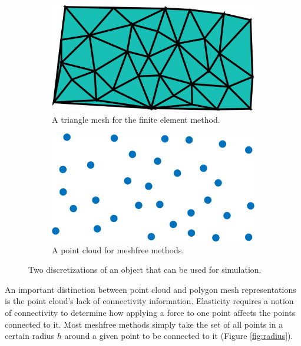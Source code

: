 \documentclass[11pt,a4paper, final, twoside]{article}
\theoremstyle{proposition}
\theoremstyle{definition}
\theoremstyle{remark}
\numberwithin{equation}{section}
\begin{document}
\begin{figure}[h]
\centering
\begin{subfigure}[t]{.5\textwidth}
  \centering
  \includegraphics[width=.7\linewidth]{meshEx.png}
  \caption{A triangle mesh for the finite element method.}
    \label{fig:meshA}
\end{subfigure}%
\begin{subfigure}[t]{.5\textwidth}
  \centering
  \includegraphics[width=.7\linewidth]{meshFreeEx.png}
  \caption{A point cloud for meshfree methods.}
    \label{fig:meshB}
\end{subfigure}
\caption{Two discretizations of an object that can be used for simulation.}
\label{fig:mesh}
\end{figure}

An important distinction between point cloud and polygon mesh representations is the point cloud's lack of connectivity information. Elasticity requires a notion of connectivity to determine how applying a force to one point affects the points connected to it. Most meshfree methods simply take the set of all points in a certain radius $h$ around a given point to be connected to it (Figure \ref{fig:radius}). \cite{liu2005introduction} 
\end{document}
